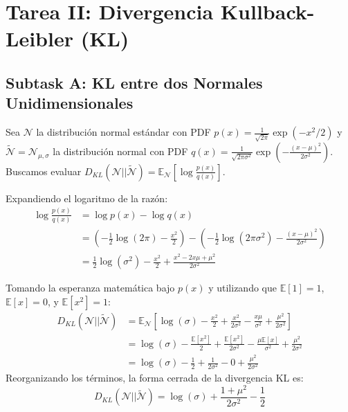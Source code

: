 \documentclass[12pt]{article}
\begin{document}
\section*{Tarea II: Divergencia Kullback-Leibler (KL)}

\subsection*{Subtask A: KL entre dos Normales Unidimensionales}
Sea $\mathcal{N}$ la distribución normal estándar con PDF $p(x) = \frac{1}{\sqrt{2\pi}}\exp(-x^2/2)$ y $\tilde{\mathcal{N}} = \mathcal{N}_{\mu,\sigma}$ la distribución normal con PDF $q(x) = \frac{1}{\sqrt{2\pi\sigma^2}}\exp(-\frac{(x-\mu)^2}{2\sigma^2})$.
Buscamos evaluar $D_{KL}(\mathcal{N} || \tilde{\mathcal{N}}) = \mathbb{E}_{\mathcal{N}} \left[ \log \frac{p(x)}{q(x)} \right]$.

Expandiendo el logaritmo de la razón:
\begin{align*}
    \log \frac{p(x)}{q(x)} &= \log p(x) - \log q(x) \\
    &= \left( -\frac{1}{2}\log(2\pi) - \frac{x^2}{2} \right) - \left( -\frac{1}{2}\log(2\pi\sigma^2) - \frac{(x-\mu)^2}{2\sigma^2} \right) \\
    &= \frac{1}{2}\log(\sigma^2) - \frac{x^2}{2} + \frac{x^2 - 2x\mu + \mu^2}{2\sigma^2}
\end{align*}

Tomando la esperanza matemática bajo $p(x)$ y utilizando que $\mathbb{E}[1] = 1$, $\mathbb{E}[x] = 0$, y $\mathbb{E}[x^2] = 1$:
\begin{align*}
    D_{KL}(\mathcal{N} || \tilde{\mathcal{N}}) &= \mathbb{E}_{\mathcal{N}}\left[ \log(\sigma) - \frac{x^2}{2} + \frac{x^2}{2\sigma^2} - \frac{x\mu}{\sigma^2} + \frac{\mu^2}{2\sigma^2} \right] \\
    &= \log(\sigma) - \frac{\mathbb{E}[x^2]}{2} + \frac{\mathbb{E}[x^2]}{2\sigma^2} - \frac{\mu\mathbb{E}[x]}{\sigma^2} + \frac{\mu^2}{2\sigma^2} \\
    &= \log(\sigma) - \frac{1}{2} + \frac{1}{2\sigma^2} - 0 + \frac{\mu^2}{2\sigma^2}
\end{align*}
Reorganizando los términos, la forma cerrada de la divergencia KL es:
\begin{equation}
    D_{KL}(\mathcal{N} || \tilde{\mathcal{N}}) = \log(\sigma) + \frac{1 + \mu^2}{2\sigma^2} - \frac{1}{2}
\end{equation}
\end{document}
